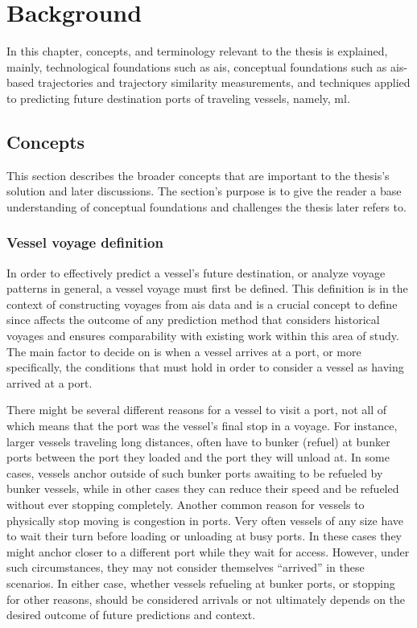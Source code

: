 \chapter{Background}

In this chapter, concepts, and terminology relevant to the thesis is explained, mainly, technological foundations such as \acrfull{ais}, conceptual foundations such as \acrshort{ais}-based trajectories and trajectory similarity measurements, and techniques applied to predicting future destination ports of traveling vessels, namely, \acrfull{ml}.

\section{Concepts}

This section describes the broader concepts that are important to the thesis's solution and later discussions. The section's purpose is to give the reader a base understanding of conceptual foundations and challenges the thesis later refers to.

\subsection{Vessel voyage definition}
\label{sec:vessel_voyage_definition}

In order to effectively predict a vessel's future destination, or analyze \gls{voyage} patterns in general, a vessel \gls{voyage} must first be defined. This definition is in the context of constructing voyages from \acrshort{ais} data and is a crucial concept to define since affects the outcome of any prediction method that considers historical voyages and ensures comparability with existing work within this area of study. The main factor to decide on is when a vessel arrives at a port, or more specifically, the conditions that must hold in order to consider a vessel as having arrived at a port.

There might be several different reasons for a vessel to visit a port, not all of which means that the port was the vessel's final stop in a voyage. For instance, larger vessels traveling long distances, often have to bunker (refuel) at bunker ports between the port they loaded and the port they will unload at. In some cases, vessels anchor outside of such bunker ports awaiting to be refueled by bunker vessels, while in other cases they can reduce their speed and be refueled without ever stopping completely. Another common reason for vessels to physically stop moving is congestion in ports. Very often vessels of any size have to wait their turn before loading or unloading at busy ports. In these cases they might anchor closer to a different port while they wait for access. However, under such circumstances, they may not consider themselves ``arrived'' in these scenarios. In either case, whether vessels refueling at bunker ports, or stopping for other reasons, should be considered arrivals or not ultimately depends on the desired outcome of future predictions and context.


